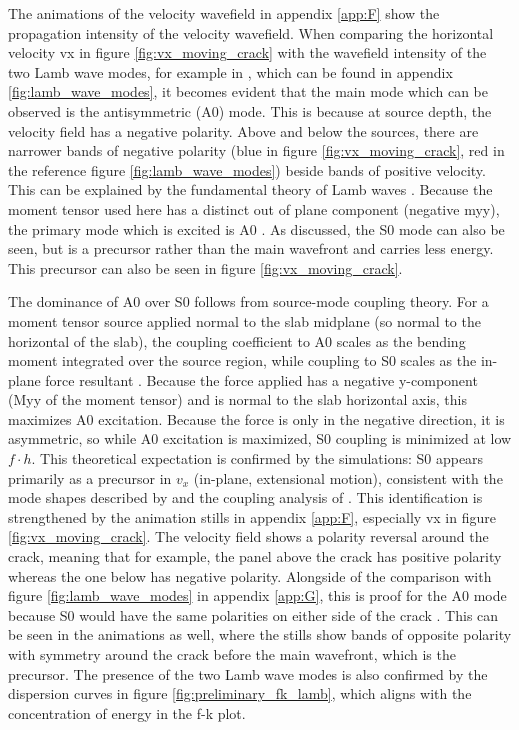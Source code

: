 The animations of the velocity wavefield in appendix \ref{app:F} show the propagation intensity of the velocity wavefield. When comparing the horizontal velocity vx in figure \ref{fig:vx_moving_crack} with the wavefield intensity of the two Lamb wave modes, for example in \cite{cartaLambWavesDiscrete2023}, which can be found in appendix \ref{fig:lamb_wave_modes}, it becomes evident that the main mode which can be observed is the antisymmetric (A0) mode. This is because at source depth, the velocity field has a negative polarity. Above and below the sources, there are narrower bands of negative polarity (blue in figure \ref{fig:vx_moving_crack}, red in the reference figure \ref{fig:lamb_wave_modes}) beside bands of positive velocity. This can be explained by the fundamental theory of Lamb waves \parencite{lambWavesElasticPlate1917,roseWavesPlates2014}. Because the moment tensor used here has a distinct out of plane component (negative myy), the primary mode which is excited is A0 \parencite{roseWavesPlates2014}. As discussed, the S0 mode can also be seen, but is a precursor rather than the main wavefront and carries less energy. This precursor can also be seen in figure \ref{fig:vx_moving_crack}. \par 

The dominance of A0 over S0 follows from source-mode coupling theory. For a moment tensor source applied normal to the slab midplane (so normal to the horizontal of the slab), the coupling coefficient to A0 scales as the bending moment integrated over the source region, while coupling to S0 scales as the in-plane force resultant \parencite{roseWavesPlates2014, achenbachWavePropagationElastic2012}. Because the force applied has a negative y-component (Myy of the moment tensor) and is normal to the slab horizontal axis, this maximizes A0 excitation. Because the force is only in the negative direction, it is asymmetric, so while A0 excitation is maximized, S0 coupling is minimized at low \(f \cdot h\). This theoretical expectation is confirmed by the simulations: S0 appears primarily as a precursor in \(v_x\) (in-plane, extensional motion), consistent
with the mode shapes described by \textcite{lambWavesElasticPlate1917} and the coupling analysis of \textcite{roseWavesPlates2014}. This identification is strengthened by the animation stills in appendix \ref{app:F}, especially vx in figure \ref{fig:vx_moving_crack}. The velocity field shows a polarity reversal around the crack, meaning that for example, the panel above the crack has positive polarity whereas the one below has negative polarity. Alongside of the comparison with figure \ref{fig:lamb_wave_modes} in appendix \ref{app:G}, this is proof for the A0 mode because S0 would have the same polarities on either side of the crack \parencite{lambWavesElasticPlate1917}. This can be seen in the animations as well, where the stills show bands of opposite polarity with symmetry around the crack before the main wavefront, which is the precursor. The presence of the two Lamb wave modes is also confirmed by the dispersion curves in figure \ref{fig:preliminary_fk_lamb}, which aligns with the concentration of energy in the f-k plot. \par



